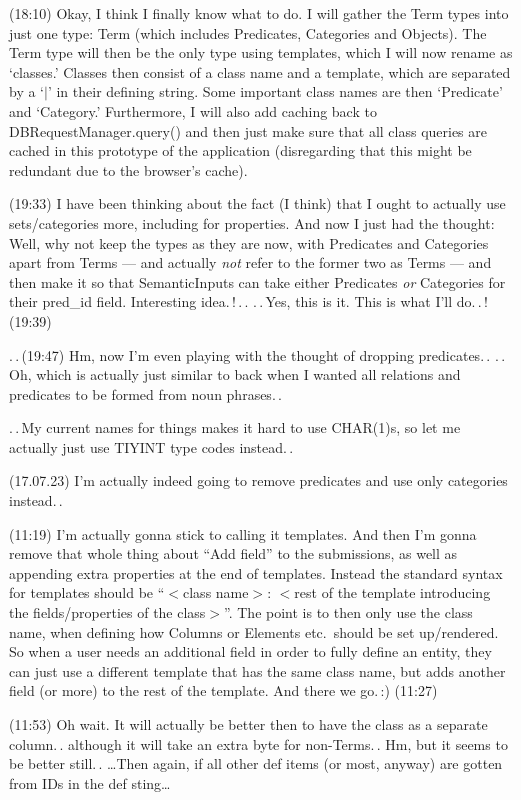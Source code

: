\documentclass{report}
\begin{document}
(18:10) Okay, I think I finally know what to do. I will gather the Term types into just one type: Term (which includes Predicates, Categories and Objects). The Term type will then be the only type using templates, which I will now rename as `classes.' Classes then consist of a class name and a template, which are separated by a `$|$' in their defining string. Some important class names are then `Predicate' and `Category.' Furthermore, I will also add caching back to DBRequestManager.query() and then just make sure that all class queries are cached in this prototype of the application (disregarding that this might be redundant due to the browser's cache).

(19:33) I have been thinking about the fact (I think) that I ought to actually use sets/categories more, including for properties. And now I just had the thought: Well, why not keep the types as they are now, with Predicates and Categories apart from Terms --- and actually \emph{not} refer to the former two as Terms --- and then make it so that SemanticInputs can take either Predicates \emph{or} Categories for their pred\_id field. Interesting idea.\,!\,.\,. .\,.\,Yes, this is it. This is what I'll do.\,.\,! (19:39)

.\,.\,(19:47) Hm, now I'm even playing with the thought of dropping predicates.\,. .\,.\,Oh, which is actually just similar to back when I wanted all relations and predicates to be formed from noun phrases.\,.

.\,.\,My current names for things makes it hard to use CHAR(1)s, so let me actually just use TIYINT type codes instead.\,.

(17.07.23) I'm actually indeed going to remove predicates and use only categories instead.\,.

(11:19) I'm actually gonna stick to calling it templates. And then I'm gonna remove that whole thing about ``Add field'' to the submissions, as well as appending extra properties at the end of templates. Instead the standard syntax for templates should be ``$<$class name$>$: $<$rest of the template introducing the fields/properties of the class$>$''. The point is to then only use the class name, when defining how Columns or Elements etc.\ should be set up/rendered. So when a user needs an additional field in order to fully define an entity, they can just use a different template that has the same class name, but adds another field (or more) to the rest of the template. And there we go.\,:) (11:27)

(11:53) Oh wait. It will actually be better then to have the class as a separate column.\,. although it will take an extra byte for non-Terms.\,. Hm, but it seems to be better still.\,.
\ldots Then again, if all other def items (or most, anyway) are gotten from IDs in the def sting\ldots 
\end{document}
